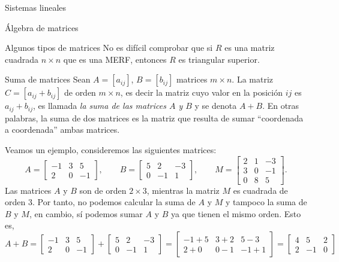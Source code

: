 \documentclass[a4paper,12pt,twoside,spanish]{amsbook}
\theoremstyle{definition}
\theoremstyle{remark}
\begin{document}
\begin{chapter}{Sistemas lineales}
\begin{section}{Álgebra de matrices}
\begin{subsection}{Algunos tipos de matrices}
				No es difícil comprobar que si $R$ es una matriz cuadrada $n \times n$  que es una MERF,  entonces $R$  es triangular superior. 
				
			 
			\end{subsection}
			
			
			\begin{subsection}{Suma  de matrices}
				Sean $A=[a_{ij}]$, $B=[b_{ij}]$ matrices  $m \times n$. La matriz $C= [a_{ij} + b_{ij}]$ de orden $m \times n$,  es decir la matriz cuyo valor en la posición $ij$ es  $a_{ij} + b_{ij}$, es llamada \textit{la suma de las matrices $A$ y $B$} y se denota $A+B$. En otras palabras, la suma de dos matrices es la matriz que resulta de sumar ``coordenada a coordenada'' ambas matrices. 
				
				Veamos un ejemplo, consideremos las siguientes matrices:
				\begin{equation*}
				A = \begin{bmatrix} -1&3&5 \\ 2&0&-1  \end{bmatrix}, \qquad
				B = \begin{bmatrix} 5&2&-3 \\ 0&-1&1  \end{bmatrix}, \qquad
				M = \begin{bmatrix} 2&1&-3 \\ 3&0&-1 \\ 0&8&5 \end{bmatrix}.
				\end{equation*}
				Las matrices $A$ y $B$ son de orden $2 \times 3$, mientras la matriz $M$ es cuadrada de orden 3. Por tanto, no podemos calcular la suma de $A$ y $M$ y tampoco la suma de $B$ y $M$, en cambio, sí podemos sumar $A$ y $B$ ya que tienen el mismo orden. Esto es,
				\begin{equation*}
				A + B = \begin{bmatrix} -1&3&5 \\ 2&0&-1  \end{bmatrix}+
				\begin{bmatrix} 5&2&-3 \\ 0&-1&1  \end{bmatrix} =
				\begin{bmatrix} -1+5&3+2&5-3 \\ 2+0&0-1&-1+1  \end{bmatrix}=
				\begin{bmatrix} 4&5&2 \\ 2&-1&0  \end{bmatrix}
				\end{equation*}
				

\end{subsection}
\end{section}
\end{chapter}
\end{document}
